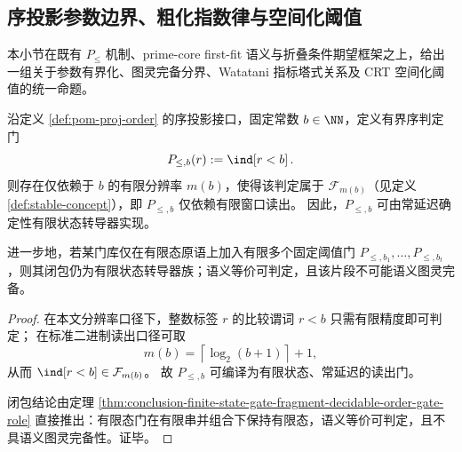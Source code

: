 \subsection{序投影参数边界、粗化指数律与空间化阈值}\label{subsec:conclusion-order-projection-parametric-completeness-watatani-renyi-crt}
本小节在既有 \(P_{\le}\) 机制、prime-core first-fit 语义与折叠条件期望框架之上，给出一组关于参数有界化、图灵完备分界、Watatani 指标塔式关系及 CRT 空间化阈值的统一命题。

\begin{theorem}[有界序投影的有限态塌缩]\label{thm:conclusion-bounded-order-projection-finite-state-collapse}
沿定义 \ref{def:pom-proj-order} 的序投影接口，固定常数 \(b\in\NN\)，定义有界序判定门
\[
P_{\le,b}(r):=\ind\!\left[r<b\right].
\]
则存在仅依赖于 \(b\) 的有限分辨率 \(m(b)\)，使得该判定属于 \(\mathcal F_{m(b)}\)（见定义 \ref{def:stable-concept}），即 \(P_{\le,b}\) 仅依赖有限窗口读出。
因此，\(P_{\le,b}\) 可由常延迟确定性有限状态转导器实现。

进一步地，若某门库仅在有限态原语上加入有限多个固定阈值门 \(P_{\le,b_1},\dots,P_{\le,b_t}\)，则其闭包仍为有限状态转导器族；语义等价可判定，且该片段不可能语义图灵完备。
\end{theorem}
\begin{proof}
在本文分辨率口径下，整数标签 \(r\) 的比较谓词 \(r<b\) 只需有限精度即可判定；
在标准二进制读出口径可取
\[
m(b)=\left\lceil\log_2(b+1)\right\rceil+1,
\]
从而 \(\ind[r<b]\in\mathcal F_{m(b)}\)。
故 \(P_{\le,b}\) 可编译为有限状态、常延迟的读出门。

闭包结论由定理 \ref{thm:conclusion-finite-state-gate-fragment-decidable-order-gate-role} 直接推出：有限态门在有限串并组合下保持有限态，语义等价可判定，且不具语义图灵完备性。证毕。
\end{proof}

